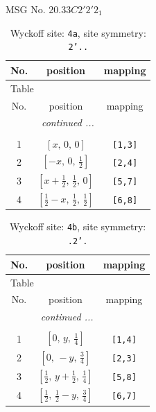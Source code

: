 \documentclass[fleqn,8pt]{jsarticle}
\begin{document}
\setcounter{MaxMatrixCols}{32}

\renewcommand{\tablename}{Table~}
\renewcommand{\figurename}{Figure~}
\begin{center}
\LARGE
MSG No. 20.33\quad$C2'2'2_{1}$
\end{center}
\renewcommand{\arraystretch}{1.2}
\begin{longtable}{ccc}
\caption{Wyckoff site: {\tt 4a}, site symmetry: {\tt 2'..}}
 \\
 \hline \hline
No. & position & mapping \\ \hline \endfirsthead

\multicolumn{2}{l}{\tablename\ \thetable{}} \\
 \hline \hline
No. & position & mapping \\ \hline \endhead

 \hline \hline
\multicolumn{2}{r}{\footnotesize\it continued ...} \\ \endfoot

 \hline \hline
\multicolumn{2}{r}{} \\ \endlastfoot

1 & $\left[ x,\, 0,\, 0 \right]$ & {\tt [1,3]} \\ \hline
2 & $\left[ - x,\, 0,\, \frac{1}{2} \right]$ & {\tt [2,4]} \\ \hline
3 & $\left[ x + \frac{1}{2},\, \frac{1}{2},\, 0 \right]$ & {\tt [5,7]} \\ \hline
4 & $\left[ \frac{1}{2} - x,\, \frac{1}{2},\, \frac{1}{2} \right]$ & {\tt [6,8]} \\
\end{longtable}
\renewcommand{\arraystretch}{1.2}
\begin{longtable}{ccc}
\caption{Wyckoff site: {\tt 4b}, site symmetry: {\tt .2'.}}
 \\
 \hline \hline
No. & position & mapping \\ \hline \endfirsthead

\multicolumn{2}{l}{\tablename\ \thetable{}} \\
 \hline \hline
No. & position & mapping \\ \hline \endhead

 \hline \hline
\multicolumn{2}{r}{\footnotesize\it continued ...} \\ \endfoot

 \hline \hline
\multicolumn{2}{r}{} \\ \endlastfoot

1 & $\left[ 0,\, y,\, \frac{1}{4} \right]$ & {\tt [1,4]} \\ \hline
2 & $\left[ 0,\, - y,\, \frac{3}{4} \right]$ & {\tt [2,3]} \\ \hline
3 & $\left[ \frac{1}{2},\, y + \frac{1}{2},\, \frac{1}{4} \right]$ & {\tt [5,8]} \\ \hline
4 & $\left[ \frac{1}{2},\, \frac{1}{2} - y,\, \frac{3}{4} \right]$ & {\tt [6,7]} \\
\end{longtable}
\end{document}
